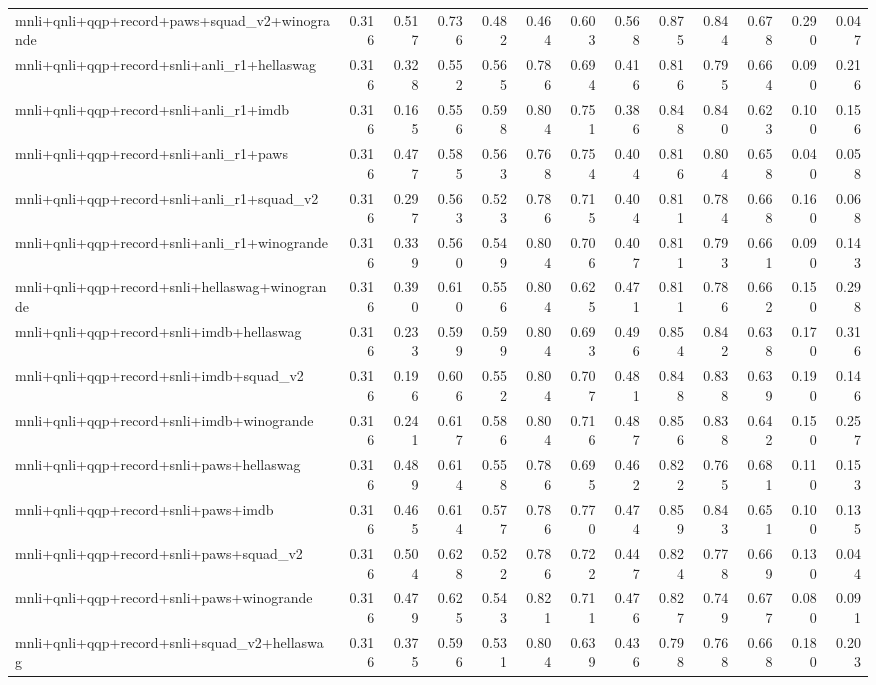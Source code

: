 \begin{table}[t]
\begin{tabular}{lrrrrrrrrrrrr}
    mnli+qnli+qqp+record+paws+squad\_v2+winogrande & 0.316 & 0.517 & 0.736 & 0.482 & 0.464 & 0.603 & 0.568 & 0.875 & 0.844 & 0.678 & 0.290 & 0.047 \\
    mnli+qnli+qqp+record+snli+anli\_r1+hellaswag & 0.316 & 0.328 & 0.552 & 0.565 & 0.786 & 0.694 & 0.416 & 0.816 & 0.795 & 0.664 & 0.090 & 0.216 \\
    mnli+qnli+qqp+record+snli+anli\_r1+imdb & 0.316 & 0.165 & 0.556 & 0.598 & 0.804 & 0.751 & 0.386 & 0.848 & 0.840 & 0.623 & 0.100 & 0.156 \\
    mnli+qnli+qqp+record+snli+anli\_r1+paws & 0.316 & 0.477 & 0.585 & 0.563 & 0.768 & 0.754 & 0.404 & 0.816 & 0.804 & 0.658 & 0.040 & 0.058 \\
    mnli+qnli+qqp+record+snli+anli\_r1+squad\_v2 & 0.316 & 0.297 & 0.563 & 0.523 & 0.786 & 0.715 & 0.404 & 0.811 & 0.784 & 0.668 & 0.160 & 0.068 \\
    mnli+qnli+qqp+record+snli+anli\_r1+winogrande & 0.316 & 0.339 & 0.560 & 0.549 & 0.804 & 0.706 & 0.407 & 0.811 & 0.793 & 0.661 & 0.090 & 0.143 \\
    mnli+qnli+qqp+record+snli+hellaswag+winogrande & 0.316 & 0.390 & 0.610 & 0.556 & 0.804 & 0.625 & 0.471 & 0.811 & 0.786 & 0.662 & 0.150 & 0.298 \\
    mnli+qnli+qqp+record+snli+imdb+hellaswag & 0.316 & 0.233 & 0.599 & 0.599 & 0.804 & 0.693 & 0.496 & 0.854 & 0.842 & 0.638 & 0.170 & 0.316 \\
    mnli+qnli+qqp+record+snli+imdb+squad\_v2 & 0.316 & 0.196 & 0.606 & 0.552 & 0.804 & 0.707 & 0.481 & 0.848 & 0.838 & 0.639 & 0.190 & 0.146 \\
    mnli+qnli+qqp+record+snli+imdb+winogrande & 0.316 & 0.241 & 0.617 & 0.586 & 0.804 & 0.716 & 0.487 & 0.856 & 0.838 & 0.642 & 0.150 & 0.257 \\
    mnli+qnli+qqp+record+snli+paws+hellaswag & 0.316 & 0.489 & 0.614 & 0.558 & 0.786 & 0.695 & 0.462 & 0.822 & 0.765 & 0.681 & 0.110 & 0.153 \\
    mnli+qnli+qqp+record+snli+paws+imdb & 0.316 & 0.465 & 0.614 & 0.577 & 0.786 & 0.770 & 0.474 & 0.859 & 0.843 & 0.651 & 0.100 & 0.135 \\
    mnli+qnli+qqp+record+snli+paws+squad\_v2 & 0.316 & 0.504 & 0.628 & 0.522 & 0.786 & 0.722 & 0.447 & 0.824 & 0.778 & 0.669 & 0.130 & 0.044 \\
    mnli+qnli+qqp+record+snli+paws+winogrande & 0.316 & 0.479 & 0.625 & 0.543 & 0.821 & 0.711 & 0.476 & 0.827 & 0.749 & 0.677 & 0.080 & 0.091 \\
    mnli+qnli+qqp+record+snli+squad\_v2+hellaswag & 0.316 & 0.375 & 0.596 & 0.531 & 0.804 & 0.639 & 0.436 & 0.798 & 0.768 & 0.668 & 0.180 & 0.203 \\

\end{tabular}
\end{table}
